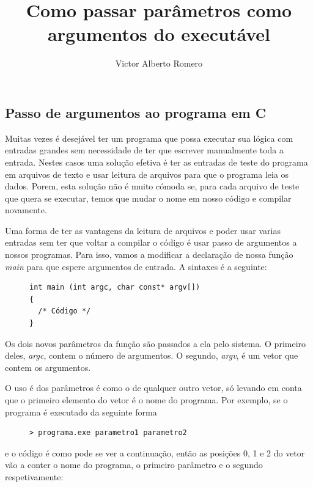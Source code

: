 \documentclass[12pt, a4paper]{article}
\author{Victor Alberto Romero}
\title{Como passar parâmetros como argumentos do executável}
\begin{document}
\maketitle

\subsection*{Passo de argumentos ao programa em C}
Muitas vezes é desejável ter um programa que possa executar sua lógica com entradas grandes sem necessidade de ter que escrever manualmente toda a entrada.
Nestes casos uma solução efetiva é ter as entradas de teste do programa em arquivos de texto e usar leitura de arquivos para que o programa leia os dados. 
Porem, esta solução não é muito cómoda se, para cada arquivo de teste que quera se executar, temos que mudar o nome em nosso código e compilar novamente.

Uma forma de ter as vantagens da leitura de arquivos e poder usar varias entradas sem ter que voltar a compilar o código é usar passo de argumentos a nossos programas.
Para isso, vamos a modificar a declaração de nossa função \emph{main} para que espere argumentos de entrada.
A sintaxes é a seguinte: 

\begin{figure}[H]
\begin{verbatim}
int main (int argc, char const* argv[])
{
  /* Código */
}
\end{verbatim}
\end{figure}

Os dois novos parâmetros da função são passados a ela pelo sistema.
O primeiro deles, \emph{argc}, contem o número de argumentos.
O segundo, \emph{argv}, é um vetor que contem os argumentos.

O uso é dos parâmetros é como o de qualquer outro vetor, só levando em conta que o primeiro elemento do vetor é o nome do programa.
Por exemplo, se o programa é executado da seguinte forma

\begin{figure}[H]
\begin{verbatim}
> programa.exe parametro1 parametro2 
\end{verbatim}
\end{figure}

e o código é como pode se ver a continuação, então as posições 0, 1 e 2 do vetor vão a conter o nome do programa, o primeiro parâmetro e o segundo respetivamente: 
\end{document}
